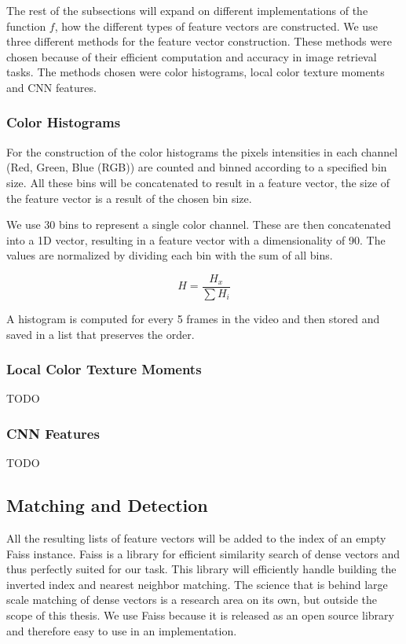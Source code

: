 \documentclass{article}
\begin{document}
The rest of the subsections will expand on different implementations of the function $f$, how the different types of feature vectors are constructed. We use three different methods for the feature vector construction. These methods were chosen because of their efficient computation and accuracy in image retrieval tasks. The methods chosen were color histograms, local color texture moments and CNN features.

\subsubsection{Color Histograms}
For the construction of the color histograms the pixels intensities in each channel (Red, Green, Blue (RGB)) are counted and binned according to a specified bin size. All these bins will be concatenated to result in a feature vector, the size of the feature vector is a result of the chosen bin size.

We use 30 bins to represent a single color channel. These are then concatenated into a 1D vector, resulting in a feature vector with a dimensionality of 90. The values are normalized by dividing each bin with the sum of all bins.

\[H = \frac{H_x}{\sum H_i} \]

A histogram is computed for every 5 frames in the video and then stored and saved in a list that preserves the order.

\subsubsection{Local Color Texture Moments}
TODO

\subsubsection{CNN Features}
TODO

\subsection{Matching and Detection}

All the resulting lists of feature vectors will be added to the index of an empty Faiss instance. Faiss is a library for efficient similarity search of dense vectors \cite{faiss, faiss-github} and thus perfectly suited for our task. This library will efficiently handle building the inverted index and nearest neighbor matching. The science that is behind large scale matching of dense vectors is a research area on its own, but outside the scope of this thesis. We use Faiss because it is released as an open source library and therefore easy to use in an implementation.
\end{document}
